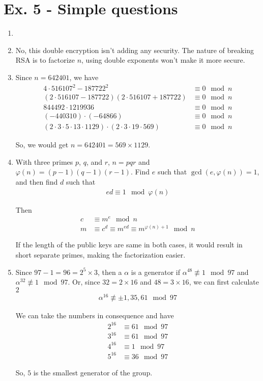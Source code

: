 \documentclass[a4paper,12pt]{journal}
\begin{document}
		\section*{Ex. 5 - Simple questions}
		\begin{enumerate}
			\item 
			
			\item No, this double encryption isn't adding any security. The nature of breaking RSA is to factorize $n$, using double exponents won't make it more secure.
			
			\item Since $n = 642401$, we have
			\begin{align*}
				4 \cdot 516107^{2} - 187722^{2} &\equiv 0 \mod n \\
				(2 \cdot 516107 - 187722)(2 \cdot 516107 + 187722) &\equiv 0 \mod n \\
				844492 \cdot 1219936 &\equiv 0 \mod n \\
				(-440310) \cdot (-64866) &\equiv0 \mod n \\
				(2 \cdot 3 \cdot 5 \cdot 13 \cdot 1129) \cdot (2 \cdot 3 \cdot 19 \cdot 569) &\equiv 0 \mod n
			\end{align*}
			\par So, we would get $n = 642401 = 569 \times 1129$.
			
			\item With three primes $p$, $q$, and $r$, $n = pqr$ and $\varphi(n) = (p-1)(q-1)(r-1)$. Find $e$ such that $\gcd(e, \varphi(n)) = 1$, and then find $d$ such that
			\begin{align*}
				ed \equiv 1 \mod \varphi(n)
			\end{align*}
			\par Then
			\begin{align*}
				c &\equiv m^{e} \mod n \\
				m &\equiv c^{d} \equiv m^{ed} \equiv m^{\varphi(n) + 1} \mod n
			\end{align*}
			\par If the length of the public keys are same in both cases, it would result in short separate primes, making the factorization easier.
			
			\item Since $97 - 1 = 96 = 2^{5} \times 3$, then a $\alpha$ is a generator if $\alpha^{48} \not\equiv 1 \mod 97$ and $\alpha^{32} \not\equiv 1 \mod 97$. Or, since $32 = 2 \times 16$ and $48 = 3 \times 16$, we can first calculate $2$
			\begin{align*}
				\alpha^{16} \not\equiv \pm 1, 35, 61 \mod 97
			\end{align*}
			\par We can take the numbers in consequence and have
			\begin{align*}
				2^{16} &\equiv 61 \mod 97 \\
				3^{16} &\equiv 61 \mod 97 \\
				4^{16} &\equiv 1  \mod 97 \\
				5^{16} &\equiv 36 \mod 97
			\end{align*}
			\par So, $5$ is the smallest generator of the group.
			

\end{enumerate}
\end{document}
